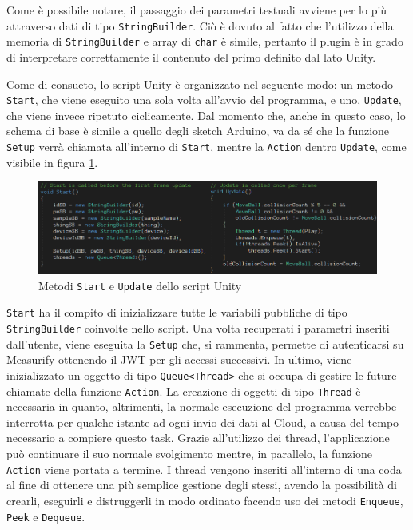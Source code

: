 Come è possibile notare, il passaggio dei parametri testuali avviene per lo più attraverso dati di tipo \texttt{StringBuilder}. Ciò è dovuto al fatto che l’utilizzo della memoria di \texttt{StringBuilder} e array di \texttt{char} è simile, pertanto il plugin è in grado di interpretare correttamente il contenuto del primo definito dal lato Unity. 

Come di consueto, lo script Unity è organizzato nel seguente modo: un metodo \texttt{Start}, che viene eseguito una sola volta all’avvio del programma, e uno, \texttt{Update}, che viene invece ripetuto ciclicamente. Dal momento che, anche in questo caso, lo schema di base è simile a quello degli sketch Arduino, va da sé che la funzione \texttt{Setup} verrà chiamata all'interno di \texttt{Start}, mentre la \texttt{Action} dentro \texttt{Update}, come visibile in figura \ref{startupdate}. 

\begin{figure}[H]
	\centering
	\includegraphics[width=\linewidth]{pics/startupdate}
	\caption{Metodi \texttt{Start} e \texttt{Update} dello script Unity}
	\label{startupdate}
\end{figure}

\texttt{Start} ha il compito di inizializzare tutte le variabili pubbliche di tipo \texttt{StringBuilder} coinvolte nello script. Una volta recuperati i parametri inseriti dall'utente, viene eseguita la \texttt{Setup} che, si rammenta, permette di autenticarsi su Measurify ottenendo il JWT per gli accessi successivi. In ultimo, viene inizializzato un oggetto di tipo \texttt{Queue<Thread>} che si occupa di gestire le future chiamate della funzione \texttt{Action}. La creazione di oggetti di tipo \texttt{Thread} è necessaria in quanto, altrimenti, la normale esecuzione del programma verrebbe interrotta per qualche istante ad ogni invio dei dati al Cloud, a causa del tempo necessario a compiere questo task. Grazie all'utilizzo dei thread, l'applicazione può continuare il suo normale svolgimento mentre, in parallelo, la funzione \texttt{Action} viene portata a termine. I thread vengono inseriti all'interno di una coda al fine di ottenere una più semplice gestione degli stessi, avendo la possibilità di crearli, eseguirli e distruggerli in modo ordinato facendo uso dei metodi \texttt{Enqueue}, \texttt{Peek} e \texttt{Dequeue}.

